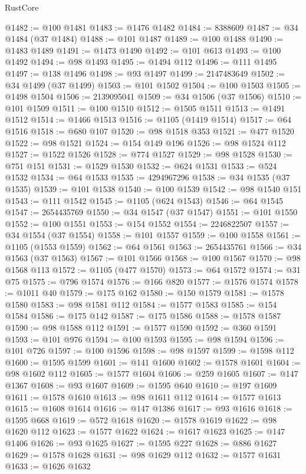\begin{lexlean}{RustCore}
\begin{coremodule}
@1482 := @100 @1481
@1483 := @1476 @1482
@1484 := 8388609
@1487 := @34 @1484 (@37 @1484)
@1488 := @101 @1487
@1489 := @100 @1488
@1490 := @1483 @1489
@1491 := @1473 @1490
@1492 := @101 @613
@1493 := @100 @1492
@1494 := @98 @1493
@1495 := @1494 @112
@1496 := @111 @1495
@1497 := @138 @1496
@1498 := @93 @1497
@1499 := 2147483649
@1502 := @34 @1499 (@37 @1499)
@1503 := @101 @1502
@1504 := @100 @1503
@1505 := @1498 @1504
@1506 := 2139095041
@1509 := @34 @1506 (@37 @1506)
@1510 := @101 @1509
@1511 := @100 @1510
@1512 := @1505 @1511
@1513 := @1491 @1512
@1514 := @1466 @1513
@1516 := @1105 (@1419 @1514)
@1517 := @64 @1516
@1518 := @680 @107
@1520 := @98 @1518 @353
@1521 := @477 @1520
@1522 := @98 @1521
@1524 := @154 @149 @196
@1526 := @98 @1524 @112
@1527 := @1522 @1526
@1528 := @774 @1527
@1529 := @98 @1528
@1530 := @751 @151
@1531 := @1529 @1530
@1532 := @624 @1531
@1533 := @524 @1532
@1534 := @64 @1533
@1535 := 4294967296
@1538 := @34 @1535 (@37 @1535)
@1539 := @101 @1538
@1540 := @100 @1539
@1542 := @98 @1540 @151
@1543 := @111 @1542
@1545 := @1105 (@624 @1543)
@1546 := @64 @1545
@1547 := 2654435769
@1550 := @34 @1547 (@37 @1547)
@1551 := @101 @1550
@1552 := @100 @1551
@1553 := @154 @1552
@1554 := 2246822507
@1557 := @34 @1554 (@37 @1554)
@1558 := @101 @1557
@1559 := @100 @1558
@1561 := @1105 (@1553 @1559)
@1562 := @64 @1561
@1563 := 2654435761
@1566 := @34 @1563 (@37 @1563)
@1567 := @101 @1566
@1568 := @100 @1567
@1570 := @98 @1568 @113
@1572 := @1105 (@477 @1570)
@1573 := @64 @1572
@1574 := @31 @75
@1575 := @796 @1574
@1576 := @166 @820
@1577 := @1576 @1574
@1578 := @1011 @40
@1579 := @175 @162
@1580 := @150 @1579
@1581 := @1578 @1580
@1583 := @98 @1581 @112
@1584 := @1577 @1583
@1585 := @154 @1584
@1586 := @175 @142
@1587 := @175 @1586
@1588 := @1578 @1587
@1590 := @98 @1588 @112
@1591 := @1577 @1590
@1592 := @360 @1591
@1593 := @101 @976
@1594 := @100 @1593
@1595 := @98 @1594
@1596 := @101 @726
@1597 := @100 @1596
@1598 := @98 @1597
@1599 := @1598 @112
@1600 := @1595 @1599
@1601 := @141 @1600
@1602 := @1578 @1601
@1604 := @98 @1602 @112
@1605 := @1577 @1604
@1606 := @259 @1605
@1607 := @147 @1367
@1608 := @93 @1607
@1609 := @1595 @640
@1610 := @197 @1609
@1611 := @1578 @1610
@1613 := @98 @1611 @112
@1614 := @1577 @1613
@1615 := @1608 @1614
@1616 := @147 @1386
@1617 := @93 @1616
@1618 := @1595 @668
@1619 := @572 @1618
@1620 := @1578 @1619
@1622 := @98 @1620 @112
@1623 := @1577 @1622
@1624 := @1617 @1623
@1625 := @147 @1406
@1626 := @93 @1625
@1627 := @1595 @227
@1628 := @886 @1627
@1629 := @1578 @1628
@1631 := @98 @1629 @112
@1632 := @1577 @1631
@1633 := @1626 @1632

\end{coremodule}
\end{lexlean}
